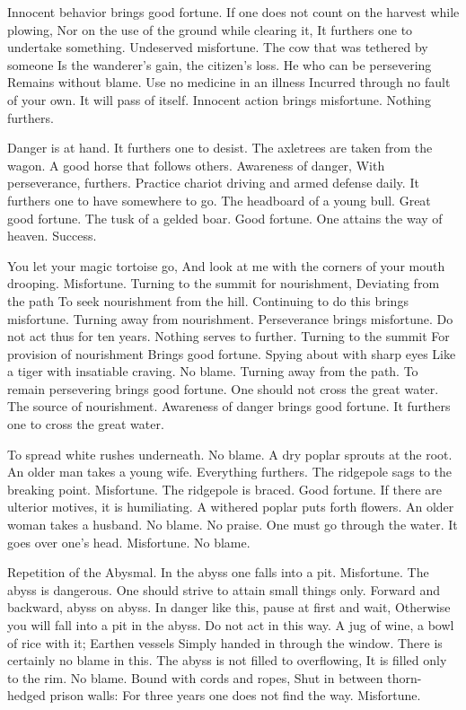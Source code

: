 {Innocent behavior brings good fortune.}
{If one does not count on the harvest while plowing,
 Nor on the use of the ground while clearing it,
 It furthers one to undertake something.}
{Undeserved misfortune.
 The cow that was tethered by someone
 Is the wanderer’s gain, the citizen’s loss.}
{He who can be persevering
 Remains without blame.}
{Use no medicine in an illness
 Incurred through no fault of your own.
 It will pass of itself.}
{Innocent action brings misfortune.
 Nothing furthers.}

{Danger is at hand. It furthers one to desist.}
{The axletrees are taken from the wagon.}
{A good horse that follows others.
 Awareness of danger,
 With perseverance, furthers.
 Practice chariot driving and armed defense daily.
 It furthers one to have somewhere to go.}
{The headboard of a young bull.
 Great good fortune.}
{The tusk of a gelded boar.
 Good fortune.}
{One attains the way of heaven. Success.}

{You let your magic tortoise go,
 And look at me with the corners of your mouth drooping.
 Misfortune.}
{Turning to the summit for nourishment,
 Deviating from the path
 To seek nourishment from the hill.
 Continuing to do this brings misfortune.}
{Turning away from nourishment.
 Perseverance brings misfortune.
 Do not act thus for ten years.
 Nothing serves to further.}
{Turning to the summit
 For provision of nourishment
 Brings good fortune.
 Spying about with sharp eyes
 Like a tiger with insatiable craving.
 No blame.}
{Turning away from the path.
 To remain persevering brings good fortune.
 One should not cross the great water.}
{The source of nourishment.
 Awareness of danger brings good fortune.
 It furthers one to cross the great water.}

{To spread white rushes underneath.
 No blame.}
{A dry poplar sprouts at the root.
 An older man takes a young wife.
 Everything furthers.}
{The ridgepole sags to the breaking point.
 Misfortune.}
{The ridgepole is braced. Good fortune.
 If there are ulterior motives, it is humiliating.}
{A withered poplar puts forth flowers.
 An older woman takes a husband.
 No blame. No praise.}
{One must go through the water.
 It goes over one’s head.
 Misfortune. No blame.}

{Repetition of the Abysmal.
 In the abyss one falls into a pit.
 Misfortune.}
{The abyss is dangerous.
 One should strive to attain small things only.}
{Forward and backward, abyss on abyss.
 In danger like this, pause at first and wait,
 Otherwise you will fall into a pit in the abyss.
 Do not act in this way.}
{A jug of wine, a bowl of rice with it;
 Earthen vessels
 Simply handed in through the window.
 There is certainly no blame in this.}
{The abyss is not filled to overflowing,
 It is filled only to the rim.
 No blame.}
{Bound with cords and ropes,
 Shut in between thorn-hedged prison walls:
 For three years one does not find the way.
 Misfortune.}

